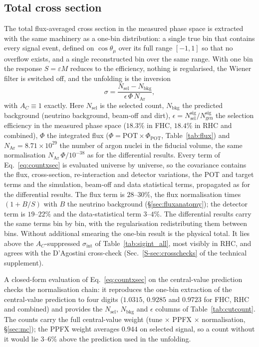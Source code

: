 \documentclass[11pt,a4paper]{article}
\newcommand{\suppref}[2]{#1~\ref{S-#2} of the technical supplement}
\begin{document}
\subsection{Total cross section}
\label{sec:total_xsec}

The total flux-averaged cross section in the measured phase space is extracted with the same
machinery as a one-bin distribution: a single true bin that contains every signal event, defined on
$\cos\theta_\mu$ over its full range $[-1,1]$ so that no overflow exists, and a single reconstructed
bin over the same range. With one bin the response $S=\varepsilon M$ reduces to the efficiency,
nothing is regularised, the Wiener filter is switched off, and the unfolding is the inversion
\begin{equation}
  \sigma = \frac{N_\mathrm{sel} - N_\mathrm{bkg}}{\epsilon \, \Phi \, N_\mathrm{Ar}},
  \label{eq:countxsec}
\end{equation}
with $A_C\equiv1$ exactly. Here $N_\mathrm{sel}$ is the selected count, $N_\mathrm{bkg}$ the predicted
background (neutrino background, beam-off and dirt), $\epsilon =
N^{\mathrm{sig}}_\mathrm{sel}/N^{\mathrm{sig}}_\mathrm{gen}$ the selection efficiency in the measured
phase space ($18.3\%$ in FHC, $18.4\%$ in RHC and combined), $\Phi$ the integrated flux ($\Phi = \text{POT}\times
\Phi_\mathrm{POT}$, Table~\ref{tab:flux}) and $N_\mathrm{Ar} = 8.71\times10^{29}$ the number of argon
nuclei in the fiducial volume, the same normalisation $N_\mathrm{Ar}\,\Phi/10^{-38}$ as for the
differential results. Every term of Eq.~\eqref{eq:countxsec} is evaluated universe by universe, so the
covariance contains the flux, cross-section, re-interaction and detector variations, the POT and
target terms and the simulation, beam-off and data statistical terms, propagated as for the
differential results. The flux term is $28$--$30\%$, the flux normalisation times $(1+B/S)$ with $B$
the neutrino background (\S\ref{sec:fluxanatomy}); the detector term is $19$--$22\%$ and the
data-statistical term $3$--$4\%$. The differential results carry the same terms bin by bin, with the
regularisation redistributing them between bins. Without additional smearing the one-bin result is
the physical total. It lies above the $A_C$-suppressed $\sigma_\mathrm{int}$ of
Table~\ref{tab:sigint_all}, most visibly in RHC, and agrees with the D'Agostini cross-check
(\suppref{Sec.}{sec:crosschecks}).

A closed-form evaluation of Eq.~\eqref{eq:countxsec} on the central-value prediction checks the
normalisation chain: it reproduces the one-bin extraction of the central-value prediction to four
digits ($1.0315$, $0.9285$ and $0.9723$ for FHC, RHC and combined) and
provides the $N_\mathrm{sel}$, $N_\mathrm{bkg}$ and $\epsilon$ columns of Table~\ref{tab:cutcount}.
The counts carry the full central-value weight (tune $\times$ PPFX $\times$ normalisation,
\S\ref{sec:mc}); the PPFX weight averages $0.944$ on selected signal, so a count without it would
lie $3$--$6\%$ above the prediction used in the unfolding.
\end{document}
